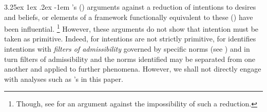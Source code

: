 \documentclass[10pt]{article}
\makeatletter
\renewcommand\paragraph{\@startsection{paragraph}{5}{\z@}%
  {3.25ex \@plus1ex \@minus.2ex}%
  {-1em}%
  {\normalfont\normalsize\bfseries}}
\makeatother
\begin{document}
\paragraph{ }%
\citeauthor{Bratman:1987aa}'s (\citeyear{Bratman:1987aa}) arguments against a reduction of intentions to desires and beliefs, or elements of a framework functionally equivalent to these (\citeyear[cf.][3--9]{Bratman:1987aa}) have been influential.\nolinebreak
\footnote{Though, see \textcite{Sinhababu:2013aa} for an argument against the impossibility of such a reduction.}
However, these arguments do not show that intention must be taken as primitive.
Indeed, for \citeauthor{Bratman:1987aa} intentions are not strictly primitive, for \citeauthor{Bratman:1987aa} identifies intentions with \emph{filters of admissibility} governed by specific norms (see \citeyear[\S2]{Bratman:1990aa}) and in turn filters of admissibility and the norms identified may be separated from one another and applied to further phenomena.
However, we shall not directly engage with analyses such as \citeauthor{Bratman:1987aa}'s in this paper.\nolinebreak
\end{document}
